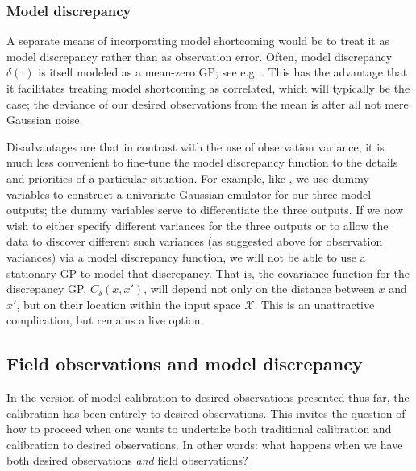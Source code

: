 \documentclass{article}
\begin{document}

\subsubsection{Model discrepancy}\label{mod_disc}

A separate means of incorporating model shortcoming would be to treat it as model discrepancy rather than as observation error. Often, model discrepancy $\delta(\cdot)$ is itself modeled as a mean-zero GP; see e.g. \cite{Williams2006}. This has the advantage that it facilitates treating model shortcoming as correlated, which will typically be the case; the deviance of our desired observations from the mean is after all not mere Gaussian noise.

Disadvantages are that in contrast with the use of observation variance, it is much less convenient to fine-tune the model discrepancy function to the details and priorities of a particular situation. For example, like \cite{Williams2006}, we use dummy variables to construct a univariate Gaussian emulator for our three model outputs; the dummy variables serve to differentiate the three outputs. If we now wish to either specify different variances for the three outputs or to allow the data to discover different such variances (as suggested above for observation variances) via a model discrepancy function, we will not be able to use a stationary GP to model that discrepancy. That is, the covariance function for the discrepancy GP, $C_\delta(x,x')$, will depend not only on the distance between $x$ and $x'$, but on their location within the input space $\mathcal X$. This is an unattractive complication, but remains a live option.

\subsection{Field observations and model discrepancy}

In the version of model calibration to desired observations presented thus far, the calibration has been entirely to desired observations. This invites the question of how to proceed when one wants to undertake both traditional calibration and calibration to desired observations. In other words: what happens when we have both desired observations \emph{and} field observations? 
\end{document}

